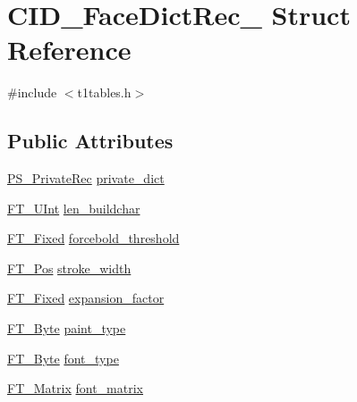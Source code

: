 \hypertarget{struct_c_i_d___face_dict_rec__}{}\section{C\+I\+D\+\_\+\+Face\+Dict\+Rec\+\_\+ Struct Reference}
\label{struct_c_i_d___face_dict_rec__}


{\ttfamily \#include $<$t1tables.\+h$>$}

\subsection*{Public Attributes}
\begin{DoxyCompactItemize}
\item 
\mbox{\hyperlink{t1tables_8h_afe2ae1e8e05fe5f125ec128d7179a462}{P\+S\+\_\+\+Private\+Rec}} \mbox{\hyperlink{struct_c_i_d___face_dict_rec___a6ccc25ba0592648bbb7a4a163fc7fdb0}{private\+\_\+dict}}
\item 
\mbox{\hyperlink{fttypes_8h_abcb8db4dbf35d2b55a9e8c7b0926dc52}{F\+T\+\_\+\+U\+Int}} \mbox{\hyperlink{struct_c_i_d___face_dict_rec___aec468e2ef1159dd49d33ff3560e8d15b}{len\+\_\+buildchar}}
\item 
\mbox{\hyperlink{fttypes_8h_a5f5a679cc09f758efdd0d1c5feed3c3d}{F\+T\+\_\+\+Fixed}} \mbox{\hyperlink{struct_c_i_d___face_dict_rec___a4db0975dbd1211cb43f4dfc36061b3cb}{forcebold\+\_\+threshold}}
\item 
\mbox{\hyperlink{ftimage_8h_af5f230f4b253d4c7715fd2e595614c90}{F\+T\+\_\+\+Pos}} \mbox{\hyperlink{struct_c_i_d___face_dict_rec___a7da1ebfa4a184b696f789c27c07f23d1}{stroke\+\_\+width}}
\item 
\mbox{\hyperlink{fttypes_8h_a5f5a679cc09f758efdd0d1c5feed3c3d}{F\+T\+\_\+\+Fixed}} \mbox{\hyperlink{struct_c_i_d___face_dict_rec___ae601bb5bc25e9a5f3da8e7c12fef6c92}{expansion\+\_\+factor}}
\item 
\mbox{\hyperlink{fttypes_8h_a51f26183ca0c9f4af958939648caeccd}{F\+T\+\_\+\+Byte}} \mbox{\hyperlink{struct_c_i_d___face_dict_rec___a77e70cc8a5eba8e6a0f6a3a3e2e8d50c}{paint\+\_\+type}}
\item 
\mbox{\hyperlink{fttypes_8h_a51f26183ca0c9f4af958939648caeccd}{F\+T\+\_\+\+Byte}} \mbox{\hyperlink{struct_c_i_d___face_dict_rec___af26e3e5ca3d912c2512e85257b635837}{font\+\_\+type}}
\item 
\mbox{\hyperlink{fttypes_8h_afeacbc4365cf2ad77162b6292f3e3e23}{F\+T\+\_\+\+Matrix}} \mbox{\hyperlink{struct_c_i_d___face_dict_rec___aa418f6ce40b7574b6234e0ab48377e4b}{font\+\_\+matrix}}

\end{DoxyCompactItemize}
